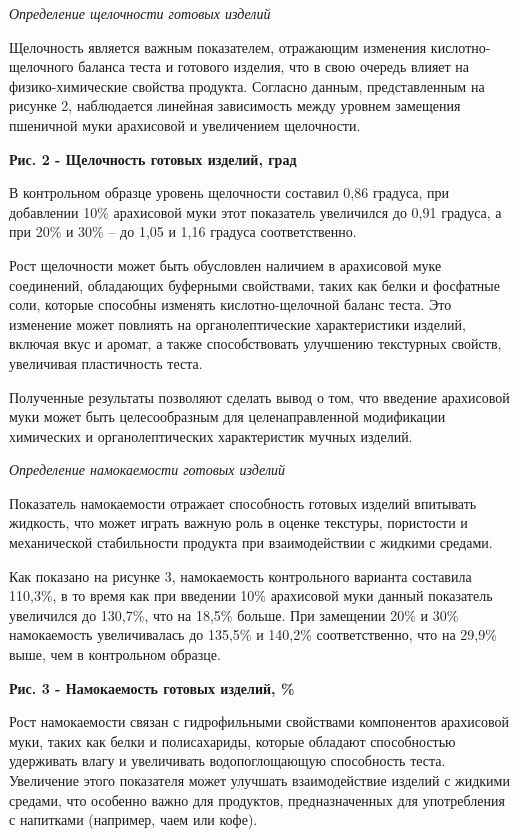 {{{\emph{Определение щелочности готовых изделий}

Щелочность является важным показателем, отражающим изменения
кислотно-щелочного баланса теста и готового изделия, что в свою очередь
влияет на физико-химические свойства продукта. Согласно данным,
представленным на рисунке 2, наблюдается линейная зависимость между
уровнем замещения пшеничной муки арахисовой и увеличением щелочности.

{\bfseries Рис. 2 - Щелочность готовых изделий, град}

В контрольном образце уровень щелочности составил 0,86 градуса, при
добавлении 10\% арахисовой муки этот показатель увеличился до 0,91
градуса, а при 20\% и 30\% -- до 1,05 и 1,16 градуса соответственно.

Рост щелочности может быть обусловлен наличием в арахисовой муке
соединений, обладающих буферными свойствами, таких как белки и фосфатные
соли, которые способны изменять кислотно-щелочной баланс теста. Это
изменение может повлиять на органолептические характеристики изделий,
включая вкус и аромат, а также способствовать улучшению текстурных
свойств, увеличивая пластичность теста.

Полученные результаты позволяют сделать вывод о том, что введение
арахисовой муки может быть целесообразным для целенаправленной
модификации химических и органолептических характеристик мучных изделий.

\emph{Определение намокаемости готовых изделий}

Показатель намокаемости отражает способность готовых изделий впитывать
жидкость, что может играть важную роль в оценке текстуры, пористости и
механической стабильности продукта при взаимодействии с жидкими средами.

Как показано на рисунке 3, намокаемость контрольного варианта составила
110,3\%, в то время как при введении 10\% арахисовой муки данный
показатель увеличился до 130,7\%, что на 18,5\% больше. При замещении
20\% и 30\% намокаемость увеличивалась до 135,5\% и 140,2\%
соответственно, что на 29,9\% выше, чем в контрольном образце.

{\bfseries Рис. 3 - Намокаемость готовых изделий, \%}

Рост намокаемости связан с гидрофильными свойствами компонентов
арахисовой муки, таких как белки и полисахариды, которые обладают
способностью удерживать влагу и увеличивать водопоглощающую способность
теста. Увеличение этого показателя может улучшать взаимодействие изделий
с жидкими средами, что особенно важно для продуктов, предназначенных для
употребления с напитками (например, чаем или кофе).

}}}
